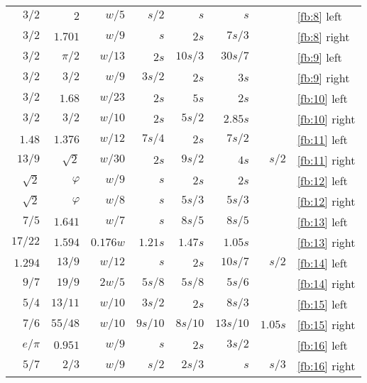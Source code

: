 \documentclass[10pt,a4paper,oneside,extrafontsizes]{memoir}%
\begin{document}
\begin{table}
\begin{tabular}{|r|r|rrrrr|l|}
$3/2$      & $2$     & $w/5$    & $s/2$  & $s$     & $s$     &       & \ref{fb:8} left \\ %
$3/2$      & $1.701$ & $w/9$    & $s$    & $2s$    & $7s/3$  &       & \ref{fb:8} right \\ %
$3/2$      & $\pi/2$ & $w/13$   & $2s$   & $10s/3$ & $30s/7$ &       & \ref{fb:9} left \\ %
$3/2$      & $3/2$   & $w/9$    & $3s/2$ & $2s$    & $3s$    &       & \ref{fb:9} right \\ %
$3/2$      & $1.68$  & $w/23$   & $2s$   & $5s$    & $2s$    &       & \ref{fb:10} left \\ %
$3/2$      & $3/2$   & $w/10$   & $2s$   & $5s/2$  & $2.85s$ &       & \ref{fb:10} right \\ %
$1.48$     & $1.376$ & $w/12$   & $7s/4$ & $2s$    & $7s/2$  &       & \ref{fb:11} left \\ %
$13/9$     & $\sqrt{2}$ & $w/30$ & $2s$  & $9s/2$  & $4s$    & $s/2$ & \ref{fb:11} right \\ %
$\sqrt{2}$ & $\varphi$ & $w/9$  & $s$    & $2s$    & $2s$    &       & \ref{fb:12} left \\ %
$\sqrt{2}$ & $\varphi$ & $w/8$  & $s$    & $5s/3$  & $5s/3$  &       & \ref{fb:12} right \\ %
$7/5$      & $1.641$   & $w/7$  & $s$    & $8s/5$  & $8s/5$  &       & \ref{fb:13} left \\ %
$17/22$    & $1.594$ & $0.176w$ & $1.21s$ & $1.47s$ & $1.05s$ &      & \ref{fb:13} right \\ %
$1.294$    & $13/9$  & $w/12$   & $s$    & $2s$    & $10s/7$ & $s/2$ & \ref{fb:14} left \\ %
$9/7$      & $19/9$  & $2w/5$   & $5s/8$ & $5s/8$  & $5s/6$  &       & \ref{fb:14} right \\ %
$5/4$      & $13/11$ & $w/10$   & $3s/2$ & $2s$    & $8s/3$  &       & \ref{fb:15} left \\ %
$7/6$      & $55/48$ & $w/10$   & $9s/10$ & $8s/10$ & $13s/10$ & $1.05s$ & \ref{fb:15} right \\ %
$e/\pi$    & $0.951$ & $w/9$    & $s$    & $2s$    & $3s/2$  &       & \ref{fb:16} left \\ %
$5/7$      & $2/3$   & $w/9$    & $s/2$  & $2s/3$  & $s$     & $s/3$ & \ref{fb:16} right \\ \hline %
\end{tabular}
\end{table}
\end{document}
